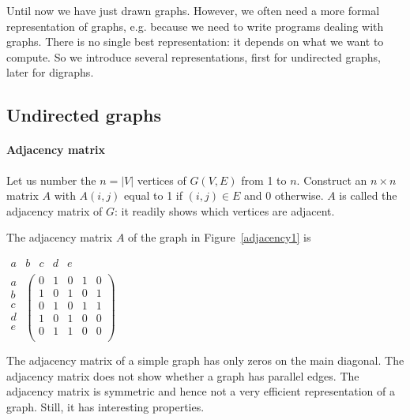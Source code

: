 Until now we have just drawn graphs. However, we often need a more
formal representation of graphs, e.g. because we need to write
programs dealing with graphs. There is no single best representation:
it depends on what we want to compute. So we introduce several
representations, first for undirected graphs, later for digraphs.

\subsection{Undirected graphs}
\paragraph{Adjacency matrix}
Let us number the $n = |V|$ vertices of $G(V,E)$ from 1 to
$n$. Construct an $n\times n$ matrix $A$ with $A(i,j)$ equal to 1 if
$(i,j) \in E$ and 0 otherwise. $A$ is called the adjacency matrix of $G$:
it readily shows which vertices are adjacent.

\begin{example}
The adjacency matrix $A$ of the graph in Figure~\ref{adjacency1} is

\begin{center}
\mbox{\space \space \space}
$\begin{array}{ccccc}
a & b & c & d & e\\
\end{array}
$\\
$
\begin{array}{c}
a\\
b\\
c\\
d\\
e\\
\end{array}
$
$
\left(
\begin{array}{ccccc}
0 & 1 & 0 & 1 & 0\\
1 & 0 & 1 & 0 & 1\\
0 & 1 & 0 & 1 & 1\\
1 & 0 & 1 & 0 & 0\\
0 & 1 & 1 & 0 & 0\\
\end{array}
\right)
$
\end{center}
\end{example}

The adjacency matrix of a simple graph has only zeros on the main
diagonal. The adjacency matrix does not show whether a graph has
parallel edges. The adjacency matrix is symmetric and hence not a
very efficient representation of a graph. Still, it has interesting
properties.

